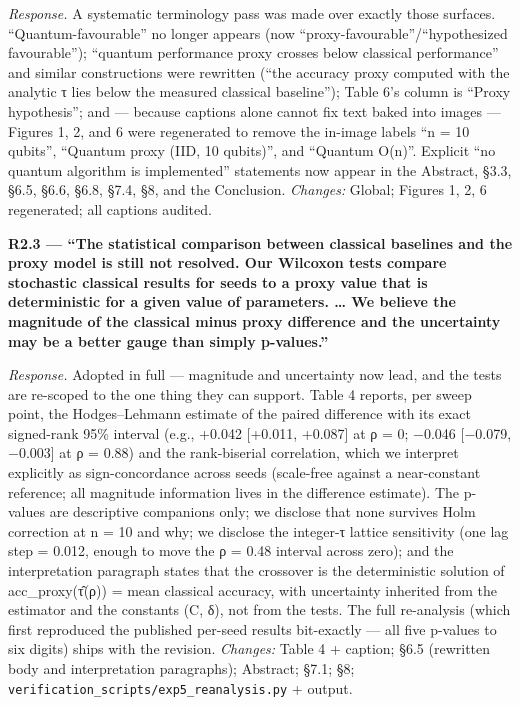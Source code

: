\documentclass[
  11pt,
]{article}
\begin{document}
\emph{Response.} A systematic terminology pass was made over exactly
those surfaces. ``Quantum-favourable'' no longer appears (now
``proxy-favourable''/``hypothesized favourable''); ``quantum performance
proxy crosses below classical performance'' and similar constructions
were rewritten (``the accuracy proxy computed with the analytic τ lies
below the measured classical baseline''); Table 6's column is ``Proxy
hypothesis''; and --- because captions alone cannot fix text baked into
images --- Figures 1, 2, and 6 were regenerated to remove the in-image
labels ``n = 10 qubits'', ``Quantum proxy (IID, 10 qubits)'', and
``Quantum O(n)''. Explicit ``no quantum algorithm is implemented''
statements now appear in the Abstract, §3.3, §6.5, §6.6, §6.8, §7.4, §8,
and the Conclusion. \emph{Changes:} Global; Figures 1, 2, 6 regenerated;
all captions audited.

\textbf{R2.3 --- ``The statistical comparison between classical
baselines and the proxy model is still not resolved. Our Wilcoxon tests
compare stochastic classical results for seeds to a proxy value that is
deterministic for a given value of parameters. \ldots{} We believe the
magnitude of the classical minus proxy difference and the uncertainty
may be a better gauge than simply p-values.''}

\emph{Response.} Adopted in full --- magnitude and uncertainty now lead,
and the tests are re-scoped to the one thing they can support. Table 4
reports, per sweep point, the Hodges--Lehmann estimate of the paired
difference with its exact signed-rank 95\% interval (e.g., +0.042
{[}+0.011, +0.087{]} at ρ = 0; −0.046 {[}−0.079, −0.003{]} at ρ = 0.88)
and the rank-biserial correlation, which we interpret explicitly as
sign-concordance across seeds (scale-free against a near-constant
reference; all magnitude information lives in the difference estimate).
The p-values are descriptive companions only; we disclose that none
survives Holm correction at n = 10 and why; we disclose the integer-τ
lattice sensitivity (one lag step = 0.012, enough to move the ρ = 0.48
interval across zero); and the interpretation paragraph states that the
crossover is the deterministic solution of acc\_proxy(τ̂(ρ)) = mean
classical accuracy, with uncertainty inherited from the estimator and
the constants (C, δ), not from the tests. The full re-analysis (which
first reproduced the published per-seed results bit-exactly --- all five
p-values to six digits) ships with the revision. \emph{Changes:} Table 4
+ caption; §6.5 (rewritten body and interpretation paragraphs);
Abstract; §7.1; §8; \texttt{verification\_scripts/exp5\_reanalysis.py} +
output.
\end{document}
